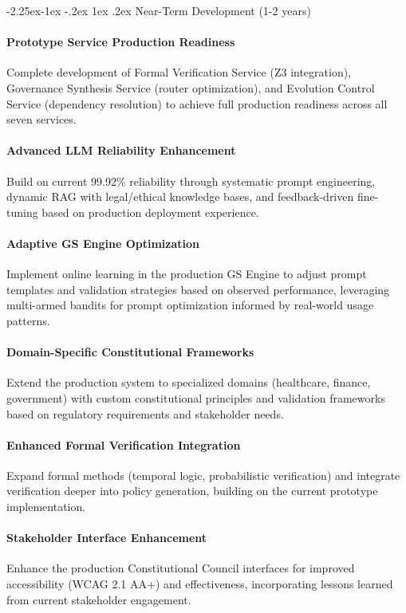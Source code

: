 \documentclass[manuscript,screen,9pt]{acmart}
\makeatletter
\renewcommand\subsection{\@startsection{subsection}{2}{\z@}%
  {-2.25ex\@plus -1ex \@minus -.2ex}%
  {1ex \@plus .2ex}%
  {\normalfont\large\bfseries}}
\makeatother
\begin{document}
\subsection{Near-Term Development (1-2 years)}
\label{subsec:near_term_research}
\paragraph{Prototype Service Production Readiness} Complete development of Formal Verification Service (Z3 integration), Governance Synthesis Service (router optimization), and Evolution Control Service (dependency resolution) to achieve full production readiness across all seven services.

\paragraph{Advanced LLM Reliability Enhancement} Build on current 99.92\% reliability through systematic prompt engineering, dynamic RAG with legal/ethical knowledge bases, and feedback-driven fine-tuning based on production deployment experience.

\paragraph{Adaptive GS Engine Optimization} Implement online learning in the production GS Engine to adjust prompt templates and validation strategies based on observed performance, leveraging multi-armed bandits for prompt optimization informed by real-world usage patterns.

\paragraph{Domain-Specific Constitutional Frameworks} Extend the production system to specialized domains (healthcare, finance, government) with custom constitutional principles and validation frameworks based on regulatory requirements and stakeholder needs.

\paragraph{Enhanced Formal Verification Integration} Expand formal methods (temporal logic, probabilistic verification) and integrate verification deeper into policy generation, building on the current prototype implementation.

\paragraph{Stakeholder Interface Enhancement} Enhance the production Constitutional Council interfaces for improved accessibility (WCAG 2.1 AA+) and effectiveness, incorporating lessons learned from current stakeholder engagement.
\end{document}
